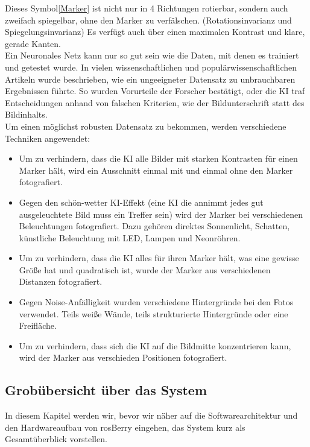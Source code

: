 \documentclass[conference]{IEEEtran}
\begin{document}
	Dieses Symbol\ref{Marker} ist nicht nur in 4 Richtungen rotierbar, sondern auch zweifach spiegelbar, ohne den Marker zu verfälschen. (Rotationsinvarianz und Spiegelungsinvarianz)
	Es verfügt auch über einen maximalen Kontrast und klare, gerade Kanten.
	\\
	\noindent
	Ein Neuronales Netz kann nur so gut sein wie die Daten, mit denen es trainiert und getestet wurde.
	In vielen wissenschaftlichen und populärwissenschaftlichen Artikeln wurde beschrieben, wie ein ungeeigneter Datensatz zu unbrauchbaren Ergebnissen führte.
	So wurden Vorurteile der Forscher bestätigt, oder die KI traf Entscheidungen anhand von falschen Kriterien, wie der Bildunterschrift statt des Bildinhalts.
	\\
	Um einen möglichst robusten Datensatz zu bekommen, werden verschiedene Techniken angewendet:
	\begin{itemize}
		\item Um zu verhindern, dass die KI alle Bilder mit starken Kontrasten für einen Marker hält, wird ein Ausschnitt einmal mit und einmal ohne den Marker fotografiert.
		\item Gegen den \glqq schön-wetter KI\grqq-Effekt (eine KI die annimmt jedes gut ausgeleuchtete Bild muss ein Treffer sein) wird der Marker bei verschiedenen Beleuchtungen fotografiert.
		Dazu gehören direktes Sonnenlicht, Schatten, künstliche Beleuchtung mit LED, Lampen und Neonröhren. 
		\item Um zu verhindern, dass die KI alles für ihren Marker hält, was eine gewisse Größe hat und quadratisch ist, wurde der Marker aus verschiedenen Distanzen fotografiert. 
		\item Gegen Noise-Anfälligkeit wurden verschiedene Hintergründe bei den Fotos verwendet. Teils weiße Wände, teils strukturierte Hintergründe oder eine Freifläche. 
		\item Um zu verhindern, dass sich die KI auf die Bildmitte konzentrieren kann, wird der Marker aus verschieden Positionen fotografiert. 
	\end{itemize}
	
	
	\subsection{Grobübersicht über das System}
	In diesem Kapitel werden wir, bevor wir näher auf die Softwarearchitektur und den Hardwareaufbau von rosBerry eingehen, das System kurz als Gesamtüberblick vorstellen.
	
\end{document}
